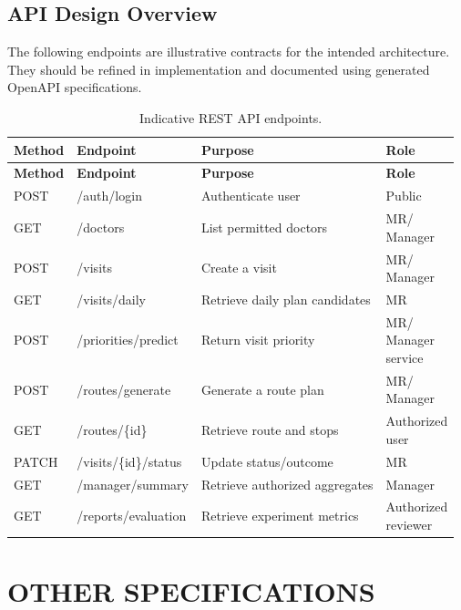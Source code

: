 \documentclass[12pt,a4paper,oneside]{report}
\begin{document}
\section{API Design Overview}
The following endpoints are illustrative contracts for the intended architecture. They should be refined in implementation and documented using generated OpenAPI specifications.
\begin{longtable}{>{\RaggedRight\arraybackslash}p{17mm}>{\RaggedRight\arraybackslash}p{49mm}>{\RaggedRight\arraybackslash}p{45mm}>{\RaggedRight\arraybackslash}p{21mm}}
\caption{Indicative REST API endpoints.}\label{tab:api}\\
\toprule
\textbf{Method} & \textbf{Endpoint} & \textbf{Purpose} & \textbf{Role}\\
\midrule
\endfirsthead
\toprule
\textbf{Method} & \textbf{Endpoint} & \textbf{Purpose} & \textbf{Role}\\
\midrule
\endhead
POST & /auth/login & Authenticate user & Public\\
GET & /doctors & List permitted doctors & \shortstack[l]{MR/\\Manager}\\
POST & /visits & Create a visit & \shortstack[l]{MR/\\Manager}\\
GET & /visits/daily & Retrieve daily plan candidates & MR\\
POST & /priorities/predict & Return visit priority & \shortstack[l]{MR/\\Manager\\service}\\
POST & /routes/generate & Generate a route plan & \shortstack[l]{MR/\\Manager}\\
GET & /routes/\{id\} & Retrieve route and stops & \shortstack[l]{Authorized\\user}\\
PATCH & /visits/\{id\}/status & Update status/outcome & MR\\
GET & /manager/summary & Retrieve authorized aggregates & Manager\\
GET & /reports/evaluation & Retrieve experiment metrics & \shortstack[l]{Authorized\\reviewer}\\
\bottomrule
\end{longtable}

\chapter{OTHER SPECIFICATIONS}
\end{document}
